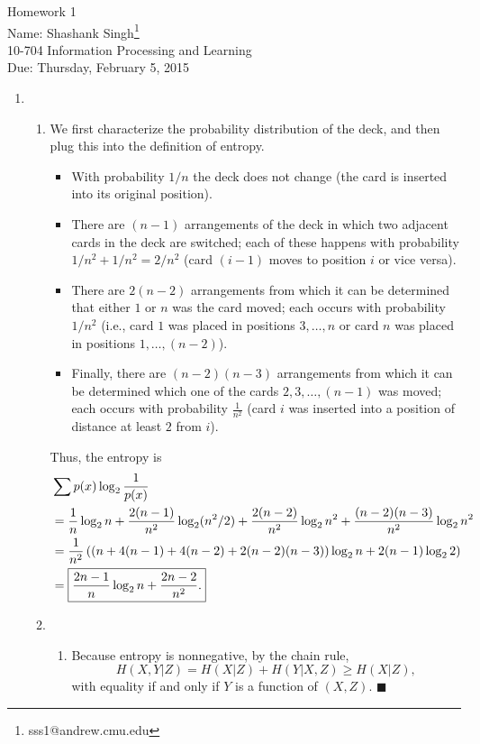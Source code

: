 \documentclass[11pt]{article}
\makeatletter
\newcommand{\myname}{Shashank Singh\footnote{sss1@andrew.cmu.edu}}
\newcommand{\myclass}{10-704 Information Processing and Learning}
\newcommand{\myhwnum}{1}
\newcommand{\duedate}{Thursday, February 5, 2015}
\renewcommand{\qed}{\quad \ensuremath{\blacksquare}}
\makeatother
\begin{document}
\thispagestyle{plain}

{\Large Homework \myhwnum} \\
Name: \myname \\
\myclass \\
Due: \duedate

\begin{enumerate}
\item
\begin{enumerate}
\item We first characterize the probability distribution of the deck, and then
plug this into the definition of entropy.
\begin{itemize}
\item With probability $1/n$ the deck does not change (the card is inserted
into its original position).
\item There are $(n - 1)$ arrangements of the deck in which two adjacent cards
in the deck are switched; each of these happens with probability
$1/n^2 + 1/n^2 = 2/n^2$ (card $(i - 1)$ moves to position $i$ or vice versa).
\item There are $2(n - 2)$ arrangements from which it can be determined that
either $1$ or $n$ was the card moved; each occurs with probability $1/n^2$
(i.e., card $1$ was placed in positions $3,\dots,n$ or card $n$ was placed in
positions $1,\dots,(n - 2)$).
\item Finally, there are $(n - 2)(n - 3)$ arrangements from which it can be 
determined which one of the cards $2,3,\dots,(n - 1)$ was moved; each occurs
with probability $\frac{1}{n^2}$ (card $i$ was inserted into a position of
distance at least $2$ from $i$).
\end{itemize}

Thus, the entropy is
\begin{align*}
 & \sum p(x) \log_2 \frac{1}{p(x)}  \\
 &  = \frac{1}{n} \log_2 n + \frac{2(n - 1)}{n^2} \log_2 (n^2/2)
    + \frac{2(n - 2)}{n^2} \log_2 n^2 + \frac{(n - 2)(n - 3)}{n^2} \log_2 n^2\\
 &  = \frac{1}{n^2} \left(
                        \left(
                            n + 4(n - 1) + 4(n - 2) + 2(n - 2)(n - 3)
                        \right) \log_2 n + 2(n - 1) \log_2 2
                    \right) \\
 &  = \mbox{\fbox{$\displaystyle
        \frac{2n - 1}{n} \log_2 n + \frac{2n - 2}{n^2}$.}}
\end{align*}

\item
\begin{enumerate}
\item Because entropy is nonnegative, by the chain rule,
\[H(X,Y|Z)
    = H(X|Z) + H(Y|X,Z)
    \geq H(X|Z),
\]
with equality if and only if $Y$ is a function of $(X,Z)$. \qed


\end{enumerate}
\end{enumerate}
\end{enumerate}
\end{document}
